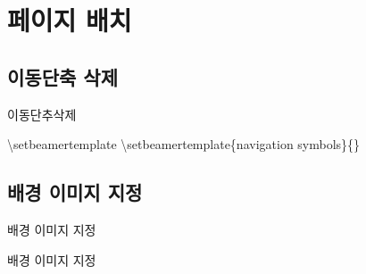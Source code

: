\documentclass[9pt,blue,xcolor=pdftex,dvipsnames,table,handout,notes]{beamer}
\begin{document}
		\section{페이지 배치}

		\subsection{이동단축 삭제}
		\begin{frame}{이동단추삭제}

			\begin{block} {\textbackslash setbeamertemplate}
			\textbackslash setbeamertemplate\{navigation symbols\}\{\}
			\end{block}
		\end{frame}


		\subsection{배경 이미지 지정}
		\begin{frame}[shrink=0]{배경 이미지 지정}

			\begin{block} {배경 이미지 지정}
			\end{block}
		\end{frame}
\end{document}
